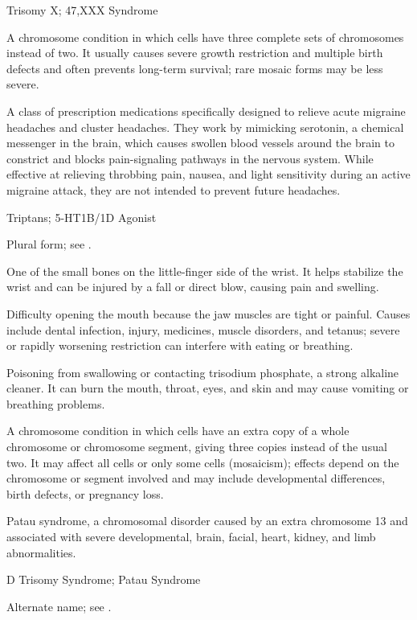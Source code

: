 \synonyms
Trisomy X; 47,XXX Syndrome

 A chromosome condition in which cells have three complete sets of chromosomes instead of two. It usually causes severe growth restriction and multiple birth defects and often prevents long-term survival; rare mosaic forms may be less severe.

 A class of prescription medications specifically designed to relieve acute migraine headaches and cluster headaches. They work by mimicking serotonin, a chemical messenger in the brain, which causes swollen blood vessels around the brain to constrict and blocks pain-signaling pathways in the nervous system. While effective at relieving throbbing pain, nausea, and light sensitivity during an active migraine attack, they are not intended to prevent future headaches.

\synonyms
Triptans; 5-HT1B/1D Agonist

 Plural form; see .

 One of the small bones on the little-finger side of the wrist. It helps stabilize the wrist and can be injured by a fall or direct blow, causing pain and swelling.

 Difficulty opening the mouth because the jaw muscles are tight or painful. Causes include dental infection, injury, medicines, muscle disorders, and tetanus; severe or rapidly worsening restriction can interfere with eating or breathing.

 Poisoning from swallowing or contacting trisodium phosphate, a strong alkaline cleaner. It can burn the mouth, throat, eyes, and skin and may cause vomiting or breathing problems.

 A chromosome condition in which cells have an extra copy of a whole chromosome or chromosome segment, giving three copies instead of the usual two. It may affect all cells or only some cells (mosaicism); effects depend on the chromosome or segment involved and may include developmental differences, birth defects, or pregnancy loss.

 Patau syndrome, a chromosomal disorder caused by an extra chromosome 13 and associated with severe developmental, brain, facial, heart, kidney, and limb abnormalities.

\synonyms
D Trisomy Syndrome; Patau Syndrome

 Alternate name; see .

